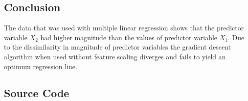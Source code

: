 \subsection{Conclusion}
The data that was used with multiple linear regression shows that the predictor variable $X_2$ had higher magnitude than the values of predictor variable $X_1$. Due to the dissimilarity in magnitude of predictor variables the gradient descent algorithm when used without feature scaling diverges and fails to yield an optimum regression line.

\subsection{Source Code}


